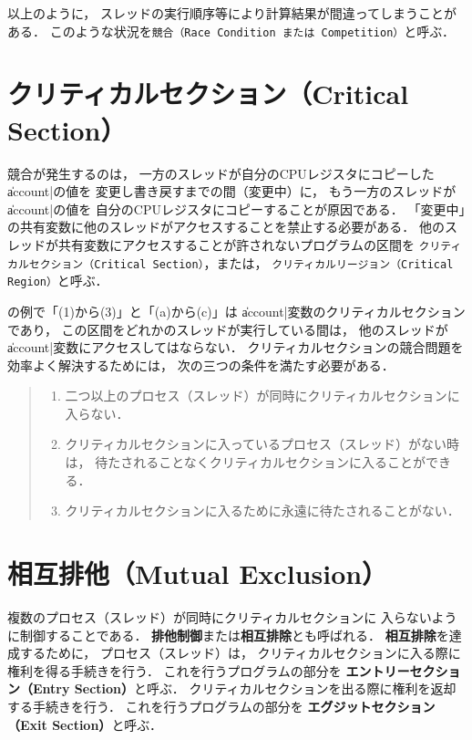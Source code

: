 以上のように，
スレッドの実行順序等により計算結果が間違ってしまうことがある．
このような状況を{\tt 競合（Race Condition または Competition）}と呼ぶ．

\section{クリティカルセクション（Critical Section）}
競合が発生するのは，
一方のスレッドが自分のCPUレジスタにコピーした\|account|の値を
変更し書き戻すまでの間（変更中）に，
もう一方のスレッドが\|account|の値を
自分のCPUレジスタにコピーすることが原因である．
「変更中」の共有変数に他のスレッドがアクセスすることを禁止する必要がある．
他のスレッドが共有変数にアクセスすることが許されないプログラムの区間を
{\tt クリティカルセクション（Critical Section）}，または，
{\tt クリティカルリージョン（Critical Region）}と呼ぶ．

の例で「(1)から(3)」と「(a)から(c)」は
\|account|変数のクリティカルセクションであり，
この区間をどれかのスレッドが実行している間は，
他のスレッドが\|account|変数にアクセスしてはならない．
クリティカルセクションの競合問題を効率よく解決するためには，
次の三つの条件を満たす必要がある．

\begin{quote}
\begin{enumerate}
\item 二つ以上のプロセス（スレッド）が同時にクリティカルセクションに入らない．
\item クリティカルセクションに入っているプロセス（スレッド）がない時は，
待たされることなくクリティカルセクションに入ることができる．
\item クリティカルセクションに入るために永遠に待たされることがない．
\end{enumerate}
\end{quote}

\section{相互排他（Mutual Exclusion）}
複数のプロセス（スレッド）が同時にクリティカルセクションに
入らないように制御することである．
{\bf 排他制御}または{\bf 相互排除}とも呼ばれる．
{\bf 相互排除}を達成するために，
プロセス（スレッド）は，
クリティカルセクションに入る際に権利を得る手続きを行う．
これを行うプログラムの部分を
{\bf エントリーセクション（Entry Section）}と呼ぶ．
クリティカルセクションを出る際に権利を返却する手続きを行う．
これを行うプログラムの部分を
{\bf エグジットセクション（Exit Section）}と呼ぶ．


